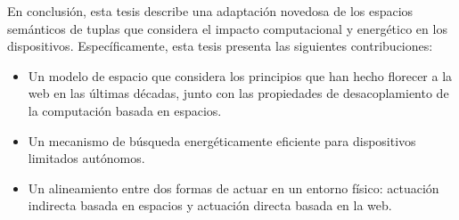 \begin{resumen}
En conclusión, esta tesis describe una adaptación novedosa de los espacios semánticos de tuplas que considera el impacto computacional y energético en los dispositivos.
Específicamente, esta tesis presenta las siguientes contribuciones:
\begin{itemize}
  \item Un modelo de espacio que considera los principios que han hecho florecer a la web en las últimas décadas, junto con las propiedades de desacoplamiento de la computación basada en espacios.
  \item Un mecanismo de búsqueda energéticamente eficiente para dispositivos limitados autónomos.
  \item Un alineamiento entre dos formas de actuar en un entorno físico: actuación indirecta basada en espacios y actuación directa basada en la web.
\end{itemize}

\end{resumen}



